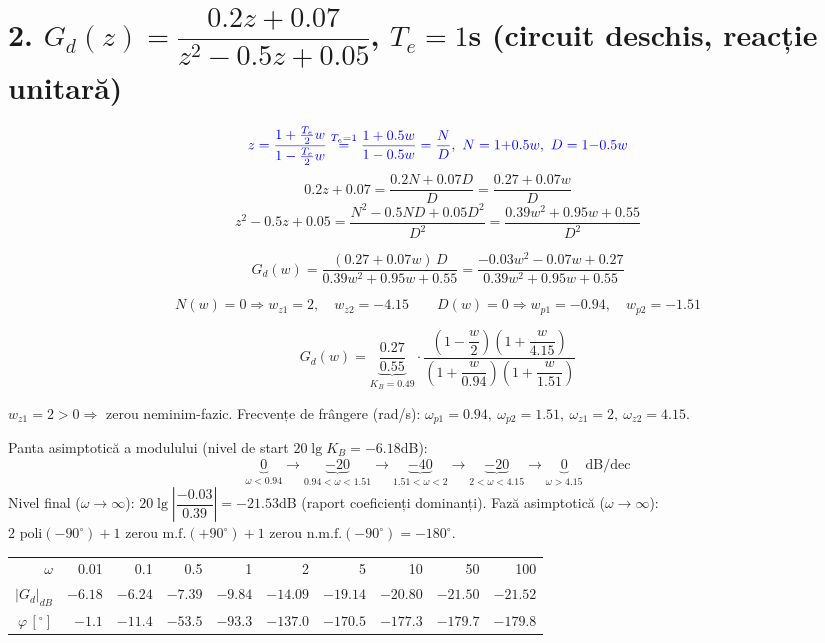 \documentclass[10pt,a4paper]{article}
\begin{document}
\section*{2. $G_d(z)=\dfrac{0.2z+0.07}{z^2-0.5z+0.05}$, $T_e=1$s (circuit deschis, reacție unitară)}
$$\color{blue}z=\frac{1+\frac{T_e}2w}{1-\frac{T_e}2w}\overset{T_e=1}{=}\frac{1+0.5w}{1-0.5w}=\frac ND,\ N=1{+}0.5w,\ D=1{-}0.5w$$
$$0.2z+0.07=\frac{0.2N+0.07D}D=\frac{0.27+0.07w}D$$
$$z^2-0.5z+0.05=\frac{N^2-0.5ND+0.05D^2}{D^2}=\frac{0.39w^2+0.95w+0.55}{D^2}$$
\begin{res}
$$G_d(w)=\frac{(0.27+0.07w)\,D}{0.39w^2+0.95w+0.55}=\frac{-0.03w^2-0.07w+0.27}{0.39w^2+0.95w+0.55}$$
\end{res}
$$N(w)=0\Rightarrow w_{z1}=2,\quad w_{z2}=-4.15\qquad D(w)=0\Rightarrow w_{p1}=-0.94,\quad w_{p2}=-1.51$$
\begin{res}
$$G_d(w)=\underbrace{\frac{0.27}{0.55}}_{K_B=0.49}\cdot\frac{\left(1-\dfrac w2\right)\left(1+\dfrac w{4.15}\right)}{\left(1+\dfrac w{0.94}\right)\left(1+\dfrac w{1.51}\right)}$$
\end{res}
$w_{z1}=2>0\Rightarrow$ zerou neminim-fazic.
Frecvențe de frângere (rad/s): $\omega_{p1}=0.94,\ \omega_{p2}=1.51,\ \omega_{z1}=2,\ \omega_{z2}=4.15$.
\begin{res}
Panta asimptotică a modulului (nivel de start $20\lg K_B=-6.18$dB):
$$\underbrace{0}_{\omega<0.94}\to\underbrace{-20}_{0.94<\omega<1.51}\to\underbrace{-40}_{1.51<\omega<2}\to\underbrace{-20}_{2<\omega<4.15}\to\underbrace{0}_{\omega>4.15}\ \text{dB/dec}$$
Nivel final ($\omega\to\infty$): $20\lg\left|\dfrac{-0.03}{0.39}\right|=-21.53$dB (raport coeficienți dominanți).
Fază asimptotică ($\omega\to\infty$): $2\text{ poli}(-90^\circ)+1\text{ zerou m.f.}(+90^\circ)+1\text{ zerou n.m.f.}(-90^\circ)=-180^\circ$.
\end{res}
\begin{res}
\begin{center}
\begin{tabular}{@{}rrrrrrrrrr@{}}
$\omega$&0.01&0.1&0.5&1&2&5&10&50&100\\
$|G_d|_{dB}$&$-6.18$&$-6.24$&$-7.39$&$-9.84$&$-14.09$&$-19.14$&$-20.80$&$-21.50$&$-21.52$\\
$\varphi\,[^\circ]$&$-1.1$&$-11.4$&$-53.5$&$-93.3$&$-137.0$&$-170.5$&$-177.3$&$-179.7$&$-179.8$\\
\end{tabular}
\end{center}
\end{res}
\end{document}
